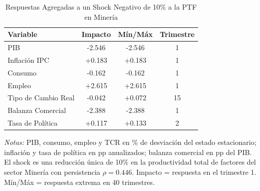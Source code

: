 \begin{table}[htbp]
\centering
\caption{Respuestas Agregadas a un Shock Negativo de 10\% a la PTF en Minería}
\label{tab:min_agg}
\begin{threeparttable}
\begin{tabular}{@{}l c c c@{}}
\toprule
Variable & Impacto & Mín/Máx & Trimestre \\
\midrule
PIB & -2.546 & -2.546 & 1 \\
Inflación IPC & +0.183 & +0.183 & 1 \\
Consumo & -0.162 & -0.162 & 1 \\
Empleo & +2.615 & +2.615 & 1 \\
Tipo de Cambio Real & -0.042 & +0.072 & 15 \\
Balanza Comercial & -2.388 & -2.388 & 1 \\
Tasa de Política & +0.117 & +0.133 & 2 \\
\bottomrule
\end{tabular}
\begin{tablenotes}[flushleft]
\footnotesize
\item \textit{Notas:} PIB, consumo, empleo y TCR en \% de desviación del estado estacionario; inflación y tasa de política en pp anualizados; balanza comercial en pp del PIB. El shock es una reducción única de 10\% en la productividad total de factores del sector Minería con persistencia $\rho = 0.446$. Impacto = respuesta en el trimestre 1. Mín/Máx = respuesta extrema en 40 trimestres.
\end{tablenotes}
\end{threeparttable}
\end{table}
